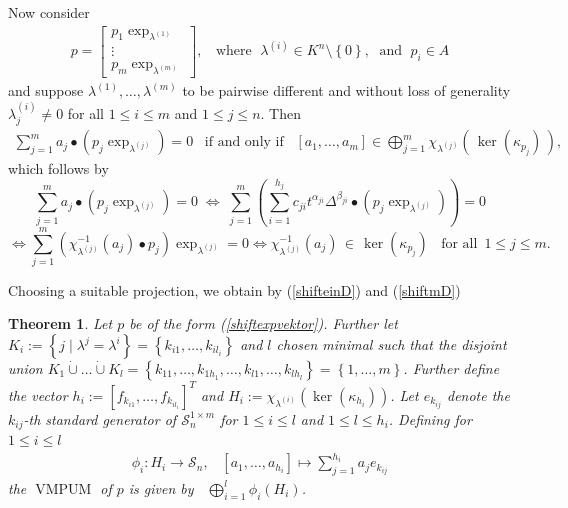 \documentclass[a4paper,10pt]{article}
\newtheorem{Th}{Theorem}[section]
\theoremstyle{nonumberplain}
\DeclareMathOperator{\VMPUM}{VMPUM}
\begin{document}
Now consider 
\begin{align}\label{shiftexpvektor}
p = \left[ \begin{array}{c} p_1 \exp_{\lambda^{(1)}} \\ 
\vdots \\ p_m \exp_{\lambda^{(m)}} \end{array}\right] , \;\; 
\mbox{ where } \;  \lambda^{(i)}  \in K^n \setminus \left\lbrace 0\right\rbrace,  \; \mbox{ and } \; p_i \in A
\end{align}
and suppose $\lambda^{(1)}, \dots, \lambda^{(m)}$ to be pairwise different and without loss of generality 
$\lambda^{(i)}_j \neq 0$ for all $1 \leq i \leq m$ and  $1\leq j\leq n$. Then 
\begin{align}\label{shiftmD}
\sum_{j=1}^m a_j \bullet (p_j \exp_{\lambda^{(j)}}) =0 \;\;\; \mbox{if and only if}\;\;\;[a_1, \dots, a_m] \in 
\bigoplus_{j=1}^m \chi_{\lambda^{(j)}}(\,\ker(\kappa_{p_j})  \,),
\end{align}
which follows by
$$\sum_{j=1}^m a_j \bullet (p_j \exp_{\lambda^{(j)}}) = 0 
\; \Leftrightarrow \; \sum_{j=1}^m \left(  \sum_{i=1}^{h_j} c_{ji} t^{\alpha_{ji}} \Delta^{\beta_{ji}} \bullet (p_j \exp_{\lambda^{(j)}})\right)  = 0 $$
$$\Leftrightarrow   \sum_{j=1}^m (\chi_{\lambda^{(j)}}^{-1}(a_j) \bullet p_j) \exp_{\lambda^{(j)}} =0 
\Leftrightarrow  \chi_{\lambda^{(j)}}^{-1}(a_j) \, \in \, \ker(\kappa_{p_j}) \;\; \mbox{ for all } \, 1 \leq j \leq m.$$

Choosing a suitable projection, we obtain by (\ref{shifteinD}) and (\ref{shiftmD})
\begin{Th}
Let $p$ be of the form (\ref{shiftexpvektor}). Further let 
$K_i:= \left\lbrace j \; | \; \lambda^j= \lambda^i \right\rbrace = 
\left\lbrace  k_{i1}, \dots, k_{i l_i}\right\rbrace $ and $l$ chosen minimal such that the disjoint union 
$K_1 \dot \cup \dots \dot \cup K_l = \left\lbrace k_{11}, \dots, k_{1h_1}, \dots, 
k_{l1}, \dots, k_{lh_l} \right\rbrace =\left\lbrace 1, \dots, m \right\rbrace $. Further define the vector 
$h_i:=[f_{k_{i1}}, \dots, f_{k_{il_i}}]^{T}$ and $H_i:=\chi_{\lambda^{(i)}}( \ker(\kappa_{h_i}) )$. 
Let  $e_{k_{ij}}$ denote the $k_{ij}$-th standard generator of $\mathcal{S}_n^{1 \times m}$ for 
$1\leq i \leq l$ and $1 \leq l \leq h_i$. Defining for $1 \leq i \leq l$
\begin{align*}
\phi_i: H_i \rightarrow \mathcal{S}_n , \;\;\; [a_1, \dots, a_{h_i}] \mapsto \sum_{j=1}^{h_i} a_j e_{k_{ij}} 
\end{align*}
the $\VMPUM$ of $p$ is given by
$ \;\;\bigoplus_{i=1}^l \phi_i(H_i)$. 
\end{Th}
\end{document}
